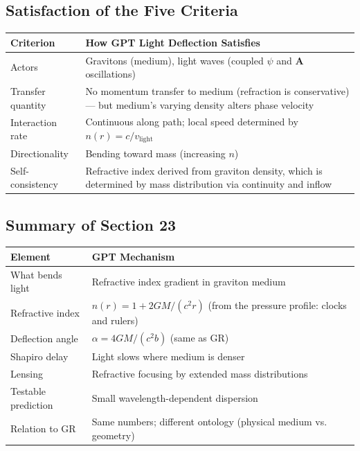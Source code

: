 \documentclass[12pt, a4paper]{article}
\begin{document}
\subsection{Satisfaction of the Five Criteria}
\label{subsec:light_criteria_23}

\begin{center}
\begin{tabular}{|p{3.5cm}|p{10cm}|}
\hline
\textbf{Criterion} & \textbf{How GPT Light Deflection Satisfies} \\
\hline
Actors & Gravitons (medium), light waves (coupled \( \psi \) and \( \mathbf{A} \) oscillations) \\
\hline
Transfer quantity & No momentum transfer to medium (refraction is conservative) — but medium's varying density alters phase velocity \\
\hline
Interaction rate & Continuous along path; local speed determined by \( n(r) = c/v_{\text{light}} \) \\
\hline
Directionality & Bending toward mass (increasing \( n \)) \\
\hline
Self-consistency & Refractive index derived from graviton density, which is determined by mass distribution via continuity and inflow \\
\hline
\end{tabular}
\end{center}

\subsection{Summary of Section 23}
\label{subsec:summary_23}

\begin{center}
\begin{tabular}{|p{4cm}|p{10cm}|}
\hline
\textbf{Element} & \textbf{GPT Mechanism} \\
\hline
What bends light & Refractive index gradient in graviton medium \\
\hline
Refractive index & \( n(r) = 1 + 2GM/(c^2 r) \) (from the pressure profile: clocks and rulers) \\
\hline
Deflection angle & \( \alpha = 4GM/(c^2 b) \) (same as GR) \\
\hline
Shapiro delay & Light slows where medium is denser \\
\hline
Lensing & Refractive focusing by extended mass distributions \\
\hline
Testable prediction & Small wavelength-dependent dispersion \\
\hline
Relation to GR & Same numbers; different ontology (physical medium vs. geometry) \\
\hline
\end{tabular}
\end{center}
\end{document}
